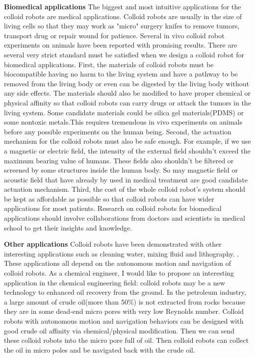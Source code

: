 \textbf{Biomedical applications} The biggest and most intuitive applications for the colloid robots are medical applications. Colloid robots are usually in the size of living cells so that they may work as "micro" surgery knifes to remove tumors, transport drug or repair wound for patience. Several in vivo colloid robot experiments  on animals have been reported \cite{Gao2015,li2018development} with promising results. There are several very strict standard must be satisfied when we design a colloid robot for biomedical applications. First, the materials of colloid robots must be biocompatible  having no harm to the living system and have a pathway to be removed from the living body or even can be digested by the living body without any side effects.
The materials should also be modified to have proper chemical or physical affinity so that colloid robots can carry drugs or attack the tumors in the living system. Some candidate materials could be silica gel materials(PDMS) or some nontoxic metals.This requires tremendous in vivo experiments on animals before  any possible experiments on the human being. Second, the actuation mechanism for the colloid robots must also be safe enough. For example, if we use a magnetic or electric field, the intensity of the external field shouldn't exceed the maximum bearing value of humans. These fields also shouldn't be  filtered or screened by some structures inside the human body. So may magnetic field or acoustic field that have already by used in medical treatment are good  candidate actuation mechanism.  Third, the cost of the whole colloid robot's system should be kept as affordable as possible so that colloid robots can have wider applications for most patients. Research on colloid robots for biomedical applications should involve collaborations from doctors and scientists in medical school to get their insights and knowledge.

\textbf{Other applications} Colloid robots have been demonstrated with other interesting applications such as cleaning water, mixing fluid and lithography. \cite{soler2014catalytic,fei2019magneto,li2014nanomotor}. These applications all depend on the autonomous motion and navigation of colloid robots. As a chemical engineer, I would like to propose an interesting application in the chemical engineering field: colloid robots may be a new technology to enhanced oil recovery from the ground. In the petroleum industry, a large amount of crude oil(more than 50$\%$) is not extracted from rocks because they are in some dead-end micro pores with very low Reynolds number. Colloid robots with autonomous motion and navigation behaviors can be designed with good crude oil affinity via chemical/physical modification. Then we can send these colloid robots into the micro pore full of oil.  Then colloid robots  can collect the oil in micro poles and be navigated back with the crude oil.

